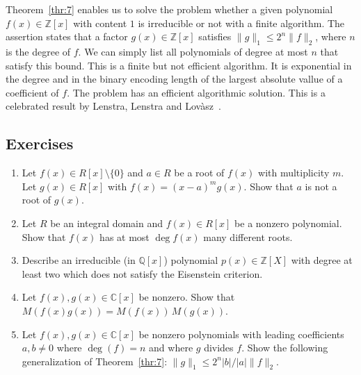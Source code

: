 Theorem~\ref{thr:7} enables us to solve the problem whether a given polynomial $f(x) ∈ℤ[x]$  with content $1$ is irreducible or not with a finite algorithm. The assertion states that a factor $g(x) ∈ℤ[x]$ satisfies $\|g\|_1 ≤ 2^n \|f\|_2$, where $n$ is the degree of $f$. We can simply list all polynomials of degree at most $n$ that satisfy this bound. This is a finite but not efficient algorithm. It is exponential in the degree and in the binary encoding length of the largest absolute vallue of a coefficient of $f$. The problem has an efficient algorithmic solution. This is a celebrated result by Lenstra, Lenstra and Lovàsz~\cite{lenstra1982factoring}.  


\subsection*{Exercises}
\begin{enumerate}
\item Let $f(x) ∈ R[x]\setminus\{0\}$ and $a ∈R$ be a root of $f(x)$ with multiplicity $m$. Let $g(x) ∈ R[x] $ with $f(x) = (x-a)^m g(x)$. Show that $a$ is not a root of $g(x)$.
\item Let $R$ be an integral domain and  $f(x) ∈ R[x]$ be a nonzero polynomial. Show that $f(x)$ has at most $\deg f(x)$ many different roots.
\item Describe an irreducible (in $ℚ[x]$) polynomial $p(x) ∈ℤ[X]$ with degree at least two which does not satisfy the Eisenstein criterion.
\item Let  $f(x),g(x) ∈ℂ[x]$ be nonzero. Show that $M(f(x)g(x)) = M(f(x)) \, M (g(x))$.
\item Let $f(x),g(x) ∈ℂ[x]$ be nonzero polynomials with leading coefficients $a,b ≠0$ where $\deg (f) = n$ and where $g$ divides $f$. Show the following generalization of Theorem~\ref{thr:7}: $\|g\|_1 ≤ 2^n |b| / |a| \|f\|_2$. 
\end{enumerate}



